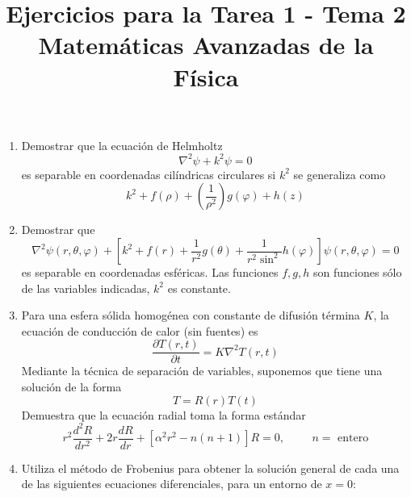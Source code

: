 
\usepackage{standalone}
\usepackage{enumerate}
\usepackage[left=1.5cm,top=1.5cm,right=1.5cm,bottom=1.5cm]{geometry}
\title{Ejercicios para la Tarea 1 - Tema 2 \\ \large{Matemáticas Avanzadas de la Física}}
\date{ }

\vspace{-4cm}
\renewcommand\labelenumii{\theenumi.{\arabic{enumii}}}
\maketitle
\fontsize{14}{14}\selectfont
\begin{enumerate}
\item Demostrar que la ecuación de Helmholtz
\[ \nabla^{2} \psi + k^{2} \psi = 0 \]
es separable en coordenadas cilíndricas circulares si $k^{2}$ se generaliza como
\[ k^{2}+f(\rho) + \left( \dfrac{1}{\rho^{2}} \right) g(\varphi) + h(z) \]
\item Demostrar que
\[ \nabla^{2} \psi (r, \theta, \varphi) + \left[ k^{2} + f(r) + \dfrac{1}{r^{2}} g(\theta) + \dfrac{1}{r^{2} \sin^{2}} h(\varphi) \right] \psi (r, \theta, \varphi) = 0 \]
es separable en coordenadas esféricas. Las funciones $f,g,h$ son funciones sólo de las variables indicadas, $k^{2}$ es constante.
\item Para una esfera sólida homogénea con constante de difusión términa $K$, la ecuación de conducción de calor (sin fuentes) es
\[ \dfrac{\partial T(r,t)}{\partial t} =  K \nabla^{2} T(r,t) \]
Mediante la técnica de separación de variables, suponemos que tiene una solución de la forma
\[ T =R(r) T(t) \]
Demuestra que la ecuación radial toma la forma estándar
\[ r^{2} \dfrac{d^{2} R}{d r^{2}} + 2r \dfrac{d R}{d r} + \left[ \alpha^{2} r^{2} - n(n+1) \right] R = 0, \hspace{1cm} n = \mbox{ entero} \]
\item Utiliza el método de Frobenius para obtener la solución general de cada una de las siguientes ecuaciones diferenciales, para un entorno de $x = 0$:
\begin{enumerate}[label=(\alph*)]

\end{enumerate}
\end{enumerate}
